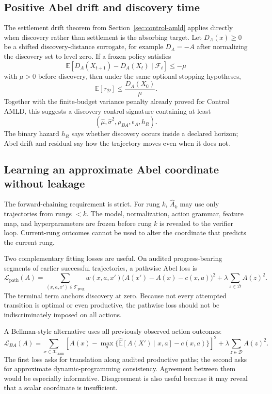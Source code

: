 \subsection{Positive Abel drift and discovery time}
The settlement drift theorem from Section~\ref{sec:control-amld} applies directly when discovery rather than settlement is the absorbing target. Let $D_A(x)\ge0$ be a shifted discovery-distance surrogate, for example $D_A=-A$ after normalizing the discovery set to level zero. If a frozen policy satisfies
\[
\mathbb E[D_A(X_{t+1})-D_A(X_t)\mid\mathcal F_t]\le-\mu
\]
with $\mu>0$ before discovery, then under the same optional-stopping hypotheses,
\[
\mathbb E[\tau_{\mathcal D}]\le\frac{D_A(X_0)}{\mu}.
\]
Together with the finite-budget variance penalty already proved for Control AMLD, this suggests a discovery control signature containing at least
\[
(\widehat\mu,\widehat\sigma^2,\rho_{BA},\epsilon_A,h_R).
\]
The binary hazard $h_R$ says whether discovery occurs inside a declared horizon; Abel drift and residual say how the trajectory moves even when it does not.

\subsection{Learning an approximate Abel coordinate without leakage}
The forward-chaining requirement is strict. For rung $k$, $\widehat A_k$ may use only trajectories from rungs $<k$. The model, normalization, action grammar, feature map, and hyperparameters are frozen before rung $k$ is revealed to the verifier loop. Current-rung outcomes cannot be used to alter the coordinate that predicts the current rung.

Two complementary fitting losses are useful. On audited progress-bearing segments of earlier successful trajectories, a pathwise Abel loss is
\[
\mathcal L_{\mathrm{path}}(A)
=
\sum_{(x,a,x')\in\mathcal T_{\mathrm{prog}}}
 w(x,a,x')\bigl(A(x')-A(x)-c(x,a)\bigr)^2
+
\lambda\sum_{z\in\mathcal D}A(z)^2.
\]
The terminal term anchors discovery at zero. Because not every attempted transition is optimal or even productive, the pathwise loss should not be indiscriminately imposed on all actions.

A Bellman-style alternative uses all previously observed action outcomes:
\[
\mathcal L_{BA}(A)
=
\sum_{x\in\mathcal X_{\mathrm{train}}}
\left[
A(x)-
\max_a\{\widehat{\mathbb E}[A(X')\mid x,a]-c(x,a)\}
\right]^2
+
\lambda\sum_{z\in\mathcal D}A(z)^2.
\]
The first loss asks for translation along audited productive paths; the second asks for approximate dynamic-programming consistency. Agreement between them would be especially informative. Disagreement is also useful because it may reveal that a scalar coordinate is insufficient.


